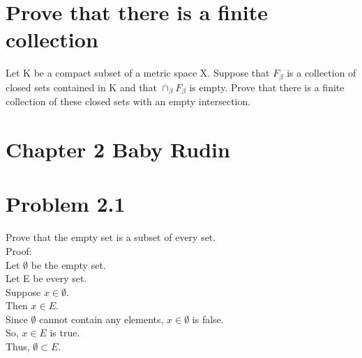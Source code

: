 \section{Prove that there is a finite collection}
Let K be a compact subset of a metric space X. Suppose that $F_{\beta}$ is a collection of closed sets contained in K and that $\cap_{\beta} F_{\beta}$ is empty. Prove that there is a finite collection of these closed sets with an empty intersection. 



\section{Chapter 2 Baby Rudin}


\section{Problem 2.1}
Prove that the empty set is a subset of every set. 
\\
Proof:\\ 
Let $\emptyset$ be the empty set. \\ 
Let E be every set. \\ 
Suppose $x \in \emptyset.$ \\ 
Then $x \in E.$ \\ 
Since $\emptyset$ cannot contain any elements, $x \in \emptyset$ is false. \\ 
So, $x \in E$ is true. \\ 
Thus, $\emptyset \subset E.$
\\

